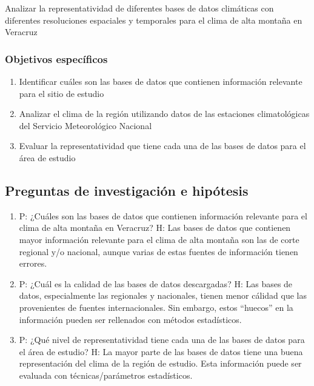 \documentclass[
  spanish,
  letterpaper,
  DIV=11,
  numbers=noendperiod]{scrartcl}
\providecommand{\tightlist}{%
  \setlength{\itemsep}{0pt}\setlength{\parskip}{0pt}}
\begin{document}
Analizar la representatividad de diferentes bases de datos climáticas
con diferentes resoluciones espaciales y temporales para el clima de
alta montaña en Veracruz

\subsubsection{Objetivos específicos}\label{objetivos-especuxedficos}

\begin{enumerate}
\def\labelenumi{\arabic{enumi}.}
\tightlist
\item
  Identificar cuáles son las bases de datos que contienen información
  relevante para el sitio de estudio
\item
  Analizar el clima de la región utilizando datos de las estaciones
  climatológicas del Servicio Meteorológico Nacional
\item
  Evaluar la representatividad que tiene cada una de las bases de datos
  para el área de estudio
\end{enumerate}

\subsection{Preguntas de investigación e
hipótesis}\label{preguntas-de-investigaciuxf3n-e-hipuxf3tesis}

\begin{enumerate}
\def\labelenumi{\alph{enumi}.}
\item
  P: ¿Cuáles son las bases de datos que contienen información relevante
  para el clima de alta montaña en Veracruz? H: Las bases de datos que
  contienen mayor información relevante para el clima de alta montaña
  son las de corte regional y/o nacional, aunque varias de estas fuentes
  de información tienen errores.
\item
  P: ¿Cuál es la calidad de las bases de datos descargadas? H: Las bases
  de datos, especialmente las regionales y nacionales, tienen menor
  cálidad que las provenientes de fuentes internacionales. Sin embargo,
  estos ``huecos'' en la información pueden ser rellenados con métodos
  estadísticos.
\item
  P: ¿Qué nivel de representatividad tiene cada una de las bases de
  datos para el área de estudio? H: La mayor parte de las bases de datos
  tiene una buena representación del clima de la región de estudio. Esta
  información puede ser evaluada con técnicas/parámetros estadísticos.
\end{enumerate}
\end{document}
